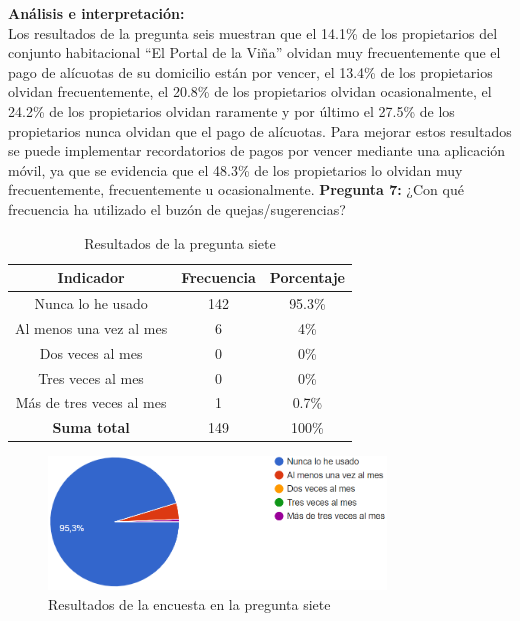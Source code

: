 \textbf{Análisis e interpretación:}\\
Los resultados de la pregunta seis muestran que el 14.1\% de los propietarios del conjunto habitacional {\textquotedblleft}El Portal de la Viña{\textquotedblright} olvidan muy frecuentemente que el pago de alícuotas de su domicilio están por vencer, el 13.4\% de los propietarios olvidan frecuentemente, el 20.8\% de los propietarios olvidan ocasionalmente, el 24.2\% de los propietarios olvidan raramente y por último el 27.5\% de los propietarios nunca olvidan que el pago de alícuotas.
Para mejorar estos resultados se puede implementar recordatorios de pagos por vencer mediante una aplicación móvil, ya que se evidencia que el 48.3\% de los propietarios lo olvidan muy frecuentemente, frecuentemente u ocasionalmente.
\bigbreak
\textbf{Pregunta 7:} ¿Con qué frecuencia ha utilizado el buzón de quejas/sugerencias?
    \begin{table}[H]
        \centering
        \caption{Resultados de la pregunta siete}
        \begin{tabular}{|c|c|c|}
            \hline
            \textbf{Indicador} & \textbf{Frecuencia} &  \textbf{Porcentaje} \\
            \hline
            Nunca lo he usado & 142 & 95.3\% \\
            \hline
            Al menos una vez al mes & 6 & 4\% \\
            \hline
            Dos veces al mes & 0 & 0\% \\
            \hline
            Tres veces al mes & 0 & 0\% \\
            \hline
            Más de tres veces al mes & 1 & 0.7\% \\
            \hline
            \textbf{Suma total} & 149 & 100\% \\
            \hline
        \end{tabular}\label{tab:table_preg_7}
    \end{table}
    \begin{figure}[H]
        \centering
        \includegraphics[width=0.8\textwidth]{resources/images/p7}
        \caption{Resultados de la encuesta en la pregunta siete}\label{fig:figure_p7}
    \end{figure}

